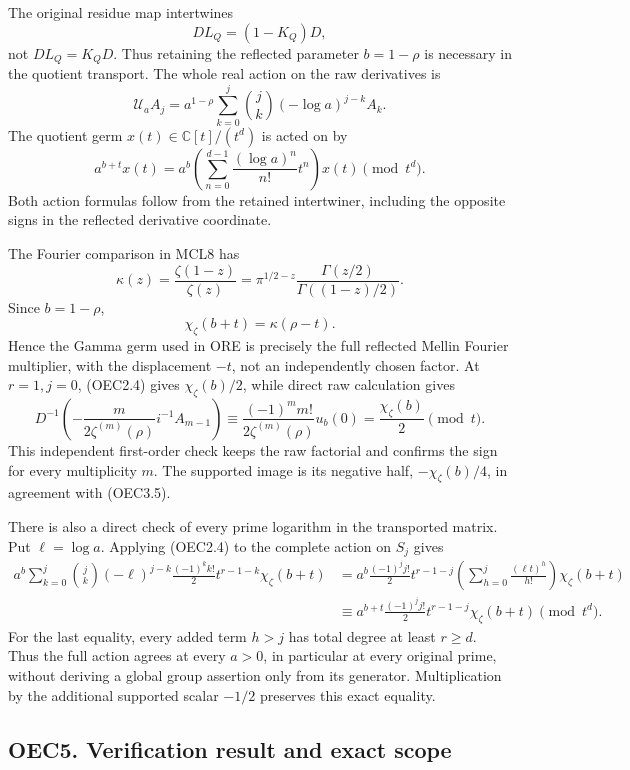 The original residue map intertwines \[
 DL_Q=(1-K_Q)D,
\] not \(DL_Q=K_QD\). Thus retaining the reflected parameter
\(b=1-\rho\) is necessary in the quotient transport. The whole real
action on the raw derivatives is \[
 \mathcal U_a A_j
 =a^{1-\rho}\sum_{k=0}^j\binom jk(-\log a)^{j-k}A_k.
\] The quotient germ \(x(t)\in\mathbb C[t]/(t^d)\) is acted on by \[
 a^{b+t}x(t)
 =a^b\left(\sum_{n=0}^{d-1}
 \frac{(\log a)^n}{n!}t^n\right)x(t)\pmod{t^d}.
 \tag{OEC4.2}
\] Both action formulas follow from the retained intertwiner, including
the opposite signs in the reflected derivative coordinate.

The Fourier comparison in MCL8 has \[
 \kappa(z)=\frac{\zeta(1-z)}{\zeta(z)}
 =\pi^{1/2-z}\frac{\Gamma(z/2)}{\Gamma((1-z)/2)}.
\] Since \(b=1-\rho\), \[
 \chi_\zeta(b+t)=\kappa(\rho-t).
 \tag{OEC4.3}
\] Hence the Gamma germ used in ORE is precisely the full reflected
Mellin Fourier multiplier, with the displacement \(-t\), not an
independently chosen factor. At \(r=1,j=0\), (OEC2.4) gives
\(\chi_\zeta(b)/2\), while direct raw calculation gives \[
 D^{-1}\left(-\frac{m}{2\zeta^{(m)}(\rho)}
             i^{-1}A_{m-1}\right)
 \equiv
 \frac{(-1)^m m!}{2\zeta^{(m)}(\rho)}u_b(0)
 =\frac{\chi_\zeta(b)}2\pmod t.
\] This independent first-order check keeps the raw factorial and
confirms the sign for every multiplicity \(m\). The supported image is
its negative half, \(-\chi_\zeta(b)/4\), in agreement with (OEC3.5).

There is also a direct check of every prime logarithm in the transported
matrix. Put \(\ell=\log a\). Applying (OEC2.4) to the complete action on
\(S_j\) gives \[
 \begin{aligned}
 a^b\sum_{k=0}^j\binom jk(-\ell)^{j-k}
   \frac{(-1)^k k!}{2}t^{r-1-k}\chi_\zeta(b+t)
 &=
 a^b\frac{(-1)^j j!}{2}t^{r-1-j}
   \left(\sum_{h=0}^j\frac{(\ell t)^h}{h!}\right)
   \chi_\zeta(b+t)\\
 &\equiv
 a^{b+t}\frac{(-1)^j j!}{2}
   t^{r-1-j}\chi_\zeta(b+t)\pmod{t^d}.
 \end{aligned}
 \tag{OEC4.4}
\] For the last equality, every added term \(h>j\) has total degree at
least \(r\ge d\). Thus the full action agrees at every \(a>0\), in
particular at every original prime, without deriving a global group
assertion only from its generator. Multiplication by the additional
supported scalar \(-1/2\) preserves this exact equality.

\subsection{OEC5. Verification result and exact
scope}\label{oec5.-verification-result-and-exact-scope}

